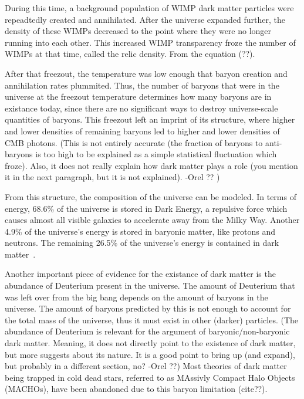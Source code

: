     During this time, a background population of WIMP dark matter particles were repeadtedly created and annihilated.
    After the universe expanded further, the density of these WIMPs decreased to the point where they were no longer running into each other.
    This increased WIMP transparency froze the number of WIMPs at that time, called the relic density.
    From the equation (??).
    
    

    
    
    
    After that freezout, the temperature was low enough that baryon creation and annihilation rates plummited.
    Thus, the number of baryons that were in the universe at the freezout temperature determines how many baryons are in existance today, since there are no significant ways to destroy universe-scale quantities of baryons.
    This freezout left an imprint of its structure, where higher and lower densities of remaining baryons led to higher and lower densities of CMB photons.
    {\color{red}(This is not entirely accurate (the fraction of baryons to anti-baryons is too high to be explained as a simple statistical fluctuation which froze).
Also, it does not really explain how dark matter plays a role (you mention it in the next paragraph, but it is not explained). -Orel ?? )}
    

    From this structure, the composition of the universe can be modeled.
    In terms of energy, 68.6\% of the universe is stored in Dark Energy, a repulsive force which causes almost all visible galaxies to accelerate away from the Milky Way.
    Another 4.9\% of the universe's energy is stored in baryonic matter, like protons and neutrons.
    The remaining 26.5\% of the universe's energy is contained in dark matter~\cite{planck2015}.

    Another important piece of evidence for the existance of dark matter is the abundance of Deuterium present in the universe.
    The amount of Deuterium that was left over from the big bang depends on the amount of baryons in the universe.
    The amount of baryons predicted by this is not enough to account for the total mass of the universe, thus it must exist in other (darker) particles.
    {\color{red}(The abundance of Deuterium is relevant for the argument of baryonic/non-baryonic dark matter. Meaning, it does not directly point to the existence of dark matter, but more suggests about its nature. It is a good point to bring up (and expand), but probably in a different section, no? -Orel ??)}
    Most theories of dark matter being trapped in cold dead stars, referred to as MAssivly Compact Halo Objects (MACHOs), have been abandoned due to this baryon limitation {\color{red}(cite??)}.

